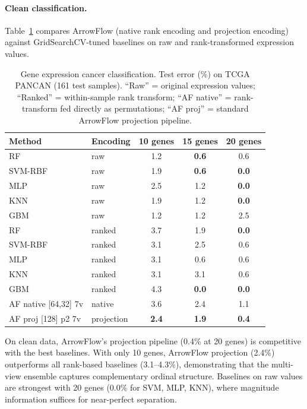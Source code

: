 \documentclass[12pt]{article}
\begin{document}
\paragraph{Clean classification.}
Table~\ref{tab:gene-clean} compares ArrowFlow (native rank encoding and projection encoding) against GridSearchCV-tuned baselines on raw and rank-transformed expression values.

\begin{table}[ht]
\centering
\caption{Gene expression cancer classification. Test error (\%) on TCGA PANCAN (161 test samples). ``Raw'' = original expression values; ``Ranked'' = within-sample rank transform; ``AF native'' = rank-transform fed directly as permutations; ``AF proj'' = standard ArrowFlow projection pipeline.}
\label{tab:gene-clean}
\small
\begin{tabular}{llccc}
\toprule
Method & Encoding & 10 genes & 15 genes & 20 genes \\
\midrule
RF         & raw      & 1.2  & \textbf{0.6}  & 0.6 \\
SVM-RBF    & raw      & 1.9  & \textbf{0.6}  & \textbf{0.0} \\
MLP        & raw      & 2.5  & 1.2  & \textbf{0.0} \\
KNN        & raw      & 1.9  & 1.2  & \textbf{0.0} \\
GBM    & raw      & 1.2  & 1.2  & 2.5 \\
\midrule
RF         & ranked   & 3.7  & 1.9  & \textbf{0.0} \\
SVM-RBF    & ranked   & 3.1  & 2.5  & 0.6 \\
MLP        & ranked   & 3.1  & 0.6  & 0.6 \\
KNN        & ranked   & 3.1  & 3.1  & 0.6 \\
GBM    & ranked   & 4.3  & \textbf{0.0}  & \textbf{0.0} \\
\midrule
AF native [64,32] 7v  & native & 3.6 & 2.4 & 1.1 \\
AF proj [128] p2 7v   & projection & \textbf{2.4} & \textbf{1.9} & \textbf{0.4} \\
\bottomrule
\end{tabular}
\end{table}

On clean data, ArrowFlow's projection pipeline (0.4\% at 20 genes) is competitive with the best baselines. With only 10 genes, ArrowFlow projection (2.4\%) outperforms all rank-based baselines (3.1--4.3\%), demonstrating that the multi-view ensemble captures complementary ordinal structure. Baselines on raw values are strongest with 20 genes (0.0\% for SVM, MLP, KNN), where magnitude information suffices for near-perfect separation.
\end{document}
